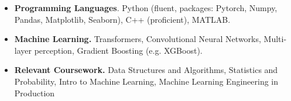 

\begin{cvparagraph}

\begin{itemize}[leftmargin=*, noitemsep]
    \item \textbf{Programming Languages}. Python (fluent, packages: Pytorch, Numpy, Pandas, Matplotlib, Seaborn), C++ (proficient), MATLAB.
    \item \textbf{Machine Learning.} Transformers, Convolutional Neural Networks, Multi-layer perception, Gradient Boosting (e.g. XGBoost). 
    \item \textbf{Relevant Coursework.} Data Structures and Algorithms, Statistics and Probability, Intro to Machine Learning, Machine Learning Engineering in Production
\end{itemize}

\end{cvparagraph}
